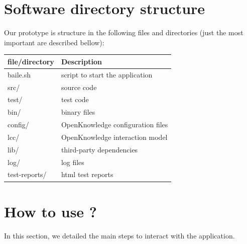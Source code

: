 \documentclass{article}	%
\begin{document}
\section{ Software directory structure}
Our prototype is structure in the following files and directories (just the most important are described bellow):

 \begin{table}[htb]
  \centering
  \begin{tabular}{|l|l|}
  \hline
  file/directory & Description \\
  \hline
  \hline
  baile.sh & script to start the application \\
  src/ & source code \\
  test/ & test code \\
  bin/ & binary files \\
  config/ & OpenKnowledge configuration files \\
  lcc/ & OpenKnowledge interaction model \\
  lib/ & third-party dependencies \\
  log/ & log files \\
  test-reports/ & html test reports \\
  \hline
  \end{tabular}
  \end{table}

\newpage 

\section{ How to use ? }
In this section, we detailed the main steps to interact with the application.
\end{document}
